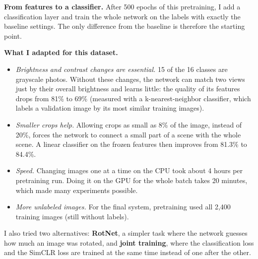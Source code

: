 \documentclass[10pt]{article}
\begin{document}
\textbf{From features to a classifier.} After 500 epochs of this pretraining, I add a classification
layer and train the whole network on the labels with exactly the baseline settings. The only
difference from the baseline is therefore the starting point.

\textbf{What I adapted for this dataset.}
\begin{itemize}
\item \emph{Brightness and contrast changes are essential.} 15 of the 16 classes are grayscale photos.
Without these changes, the network can match two views just by their overall brightness and learns
little: the quality of its features drops from 81\% to 69\% (measured with a k-nearest-neighbor
classifier, which labels a validation image by its most similar training images).
\item \emph{Smaller crops help.} Allowing crops as small as 8\% of the image, instead of 20\%, forces the
network to connect a small part of a scene with the whole scene. A linear classifier on the frozen
features then improves from 81.3\% to 84.4\%.
\item \emph{Speed.} Changing images one at a time on the CPU took about 4 hours per pretraining run.
Doing it on the GPU for the whole batch takes 20 minutes, which made many experiments possible.
\item \emph{More unlabeled images.} For the final system, pretraining used all 2,400 training images
(still without labels).
\end{itemize}
I also tried two alternatives: \textbf{RotNet}, a simpler task where the network guesses how much an
image was rotated, and \textbf{joint training}, where the classification loss and the SimCLR loss are
trained at the same time instead of one after the other.
\end{document}
